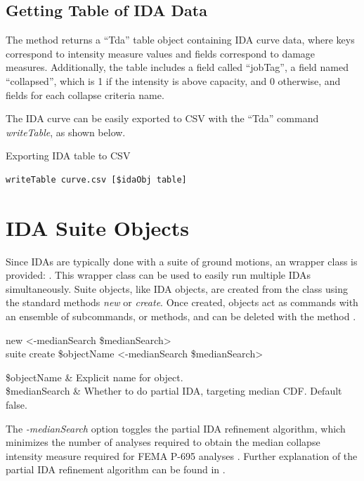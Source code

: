 \documentclass{article}
\renewcommand{\^}[1]{\textsuperscript{#1}}
\renewcommand{\_}[1]{\textsubscript{#1}}
\begin{document}
\subsection{Getting Table of IDA Data}
The method  returns a ``Tda'' table object containing IDA curve data, where keys correspond to intensity measure values and fields correspond to damage measures. 
Additionally, the table includes a field called ``jobTag'', a field named ``collapsed'', which is 1 if the intensity is above capacity, and 0 otherwise, and fields for each collapse criteria name.

\begin{syntax}
\end{syntax}
The IDA curve can be easily exported to CSV with the ``Tda'' command \textit{writeTable}, as shown below.
\begin{example}{Exporting IDA table to CSV}
\begin{lstlisting}
writeTable curve.csv [$idaObj table]
\end{lstlisting}
\end{example}

\clearpage
\section{IDA Suite Objects}
Since IDAs are typically done with a suite of ground motions, an wrapper class is provided: .
This wrapper class can be used to easily run multiple IDAs simultaneously.
Suite objects, like IDA objects, are created from the  class using the standard methods \textit{new} or \textit{create}.
Once created,  objects act as commands with an ensemble of subcommands, or methods, and can be deleted with the method .
\begin{syntax}
 new <-medianSearch \$medianSearch> \\
suite create \$objectName <-medianSearch \$medianSearch>
\end{syntax}
\begin{args}
\$objectName & Explicit name for object. \\
\$medianSearch & Whether to do partial IDA, targeting median CDF. Default false.
\end{args}

The \textit{-medianSearch} option toggles the partial IDA refinement algorithm, which minimizes the number of analyses required to obtain the median collapse intensity measure required for FEMA P-695 analyses \cite{fema_quantification_2009}. 
Further explanation of the partial IDA refinement algorithm can be found in \cite{baker_kinematics_2022}.  
\end{document}
